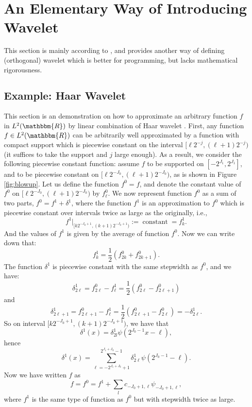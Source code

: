 \documentclass{book}
\newcommand{\assign}{:=}
\newcommand{\tmop}[1]{\ensuremath{\operatorname{#1}}}
\begin{document}
\section{An Elementary Way of Introducing Wavelet}

This section is mainly according to
{\cite{WangJizeng2001,williams1994introduction}}, and provides another way of
defining (orthogonal) wavelet which is better for programming, but lacks
mathematical rigorousness.

\subsection{Example: Haar Wavelet}

\label{haarWavelet}This section is an demonstration on how to approximate an
arbitrary function $f$ in $L^2 (\mathbbm{R})$ by linear combination of Haar
wavelet {\cite{daubechies1992ten}}. First, any function $f \in L^2
(\mathbbm{R})$ can be arbitrarily well approximated by a function with compact
support which is piecewise constant on the interval $[\ell 2^{- j}, (\ell + 1)
2^{- j})$ (it suffices to take the support and $j$ large enough). As a result,
we consider the following piecewise constant function: assume $f$ to be
supported on $[- 2^{J_1}, 2^{J_1}]$, and to be piecewise constant on $[\ell
2^{- J_0}, (\ell + 1) 2^{- J_0})$, as is shown in Figure \ref{fig:blowup}. Let
us define the function $f^0 = f$, and denote the constant value of $f^0$ on
$[\ell 2^{- J_0}, (\ell + 1) 2^{- J_0})$ by $f^0_{\ell}$. We now represent
function $f^0$ as a sum of two parts, $f^0 = f^1 + \delta^1$, where the
function $f^1$ is an approximation to $f^0$ which is piecewise constant over
intervals twice as large as the originally, i.e.,
\[ f^1 |_{[k 2^{- J_0 + 1}, (k + 1) 2^{- J_0 + 1})} \assign \tmop{constant} =
   f_k^1 . \]
And the values of $f^1$ is given by the average of function $f^0$. Now we can
write down that:
\begin{equation}
  f_k^1 = \frac{1}{2} (f_{2 k}^0 + f_{2 k + 1}^0) .
\end{equation}
The function $\delta^1$ is piecewise constant with the same stepwidth as
$f^0$, and we have:
\begin{equation}
  \delta_{2 \ell}^1 = f_{2 \ell}^0 - f_{\ell}^1 = \frac{1}{2} (f_{2 \ell}^0 -
  f_{2 \ell + 1}^0)
\end{equation}
and
\begin{equation}
  \delta_{2 \ell + 1}^1 = f_{2 \ell + 1}^0 - f_{\ell}^1 = \frac{1}{2} (f_{2
  \ell + 1}^0 - f_{2 \ell^{}}^0) = - \delta_{2 \ell}^1 .
\end{equation}
So on interval $[k 2^{- J_0 + 1}, (k + 1) 2^{- J_0 + 1})$, we have that
\[ \delta^1 (x) = \delta_{2 l}^1 \psi (2^{J_0 - 1} x - \ell), \]
hence
\begin{equation}
  \delta^1 (x) = \sum_{\ell = - 2^{J_1 + J_0} + 1}^{2^{J_1 + J_0} - 1}
  \delta^1_{2 \ell} \psi (2^{J_0 - 1} - \ell) .
\end{equation}
Now we have written $f$ as
\[ f = f^0 = f^1 + \sum_l c_{- J_0 + 1, \ell} \psi_{- J_0 + 1, \ell}, \]
where $f^1$ is the same type of function as $f^0$ but with stepwidth twice as
large.
\end{document}
